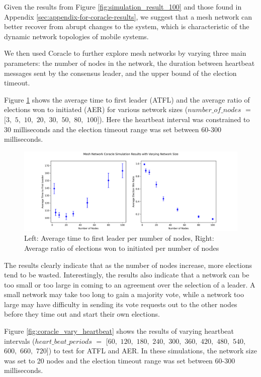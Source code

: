 Given the results from Figure \ref{fig:simulation_result_100} and those found in Appendix \ref{sec:appendix-for-coracle-results}, we suggest that a mesh network can better recover from abrupt changes to the system, which is characteristic of the dynamic network topologies of mobile systems.

We then used Coracle to further explore mesh networks by varying three main parameters: the number of nodes in the network, the duration between heartbeat messages sent by the consensus leader, and the upper bound of the election timeout. 

Figure \ref{fig:coracle_vary_nodes} shows the average time to first leader (ATFL) and the average ratio of elections won to initiated (AER) for various network sizes ($number\_of\_nodes$ $ = $ $[3,$ $5,$ $10,$ $20,$ $30,$ $50,$ $80,$ $100]$). Here the heartbeat interval was constrained to 30 milliseconds and the election timeout range was set between 60-300 milliseconds.

\begin{figure}[H]
    \centering
    \includegraphics[width=0.9\columnwidth]{images/coracle_vary_nodes.png}
    \caption{Left: Average time to first leader per number of nodes, Right: Average ratio of elections won to initiated per number of nodes}
    \label{fig:coracle_vary_nodes}
\end{figure}

The results clearly indicate that as the number of nodes increase, more elections tend to be wasted. Interestingly, the results also indicate that a network can be too small or too large in coming to an agreement over the selection of a leader. A small network may take too long to gain a majority vote, while a network too large may have difficulty in sending its vote requests out to the other nodes before they time out and start their own elections. 

Figure \ref{fig:coracle_vary_heartbeat} shows the results of varying heartbeat intervals ($heart\_beat\_periods$ $ = $ $[60,$ $120,$ $180,$ $240,$ $300,$ $360,$ $420,$ $480,$ $540,$ $600,$ $660,$ $720]
$) to test for ATFL and AER. In these simulations, the network size was set to 20 nodes and the election timeout range was set between 60-300 milliseconds.

